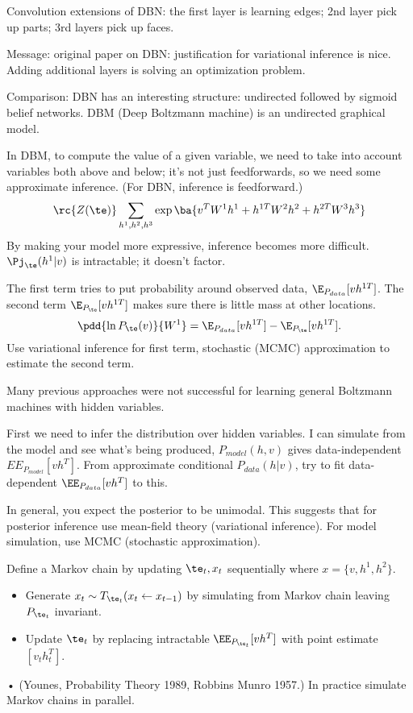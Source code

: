 Convolution extensions of DBN: the first layer is learning edges; 2nd layer pick up parts; 3rd layers pick up faces.

Message: original paper on DBN: justification for variational inference is nice. Adding additional layers is solving an optimization problem.

Comparison: DBN  has an interesting structure: undirected followed by sigmoid belief networks. DBM  (Deep Boltzmann machine) is an undirected graphical model.

In DBM, to compute the value of a given variable, we need to take into account variables both above and below; it's not just feedforwards, so we need some approximate inference. (For DBN, inference is feedforward.)
$$
\rc{Z(\te)} \sum_{h^1,h^2,h^3} \exp\ba{v^TW^1h^1 + h^{1T} W^2 h^2 + h^{2T} W^3 h^{3}}
$$
By making your model more expressive, inference becomes more difficult.
$\Pj_\te(h^1|v)$ is intractable; it doesn't factor. 

The first term tries to put probability around observed data, $\E_{P_{data}} [vh^{1T}]$. The second term $\E_{P_\te}[vh^{1T}]$ makes sure there is little mass at other locations. 
$$\pdd{\ln P_\te (v)}{W^1}= \E_{P_{data}} [vh^{1T}]-\E_{P_\te}[vh^{1T}].$$
Use variational inference for first term, stochastic (MCMC) approximation to estimate the second term.

Many previous approaches were not successful for learning general Boltzmann machines with hidden variables.

First we need to infer the distribution over hidden variables.  I can simulate from the model and see what's being produced, $P_{model} (h,v) $ gives data-independent $EE_{P_{model}}[vh^T]$. 
From approximate conditional $P_{data}(h|v)$, try to fit data-dependent $\EE_{P_{data}}[vh^T]$ to this.

In general, you expect the posterior to be unimodal. This suggests that for posterior inference use mean-field theory (variational inference). For model simulation, use MCMC (stochastic approximation).

Define a Markov chain by updating $\te_t,x_t$ sequentially where $x=\{v,h^1,h^2\}$.
\begin{itemize}
\item
 Generate $x_t \sim T_{\te_t}(x_t\leftarrow x_{t-1})$ by simulating from Markov chain leaving $P_{\te_t}$ invariant.
 \item
 Update $\te_t$ by replacing intractable $\EE_{P_{\te_t}}[vh^T]$ with point estimate $[v_th_t^T]$.
\end{itemize}•
 (Younes, Probability Theory 1989, Robbins Munro 1957.)
In practice simulate  Markov chains in parallel.

